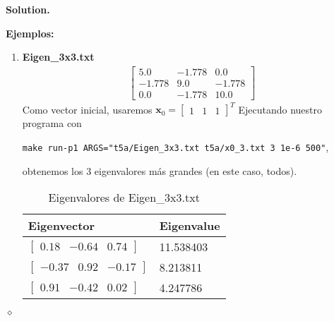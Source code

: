 \documentclass{article}
\theoremstyle{problemstyle}
\newenvironment{solution}{%
  \begin{mdframed}[linewidth=0.8pt,linecolor=Gray,backgroundcolor=Gray!5,roundcorner=5pt]%
  \noindent\textbf{Solution.}%
}{%
\hfill $ \diamond $ 
  \end{mdframed}%
}
\begin{document}
\begin{solution}
	\textbf{Ejemplos:}
	\begin{enumerate}
    \item \textbf{Eigen\_3x3.txt}
		      \begin{align*}
			      \begin{bmatrix}
				      5.0    & -1.778 & 0.0    \\
				      -1.778 & 9.0    & -1.778 \\
				      0.0    & -1.778 & 10.0
			      \end{bmatrix}
		      \end{align*}
		      Como vector inicial, usaremos $ \mathbf{x}_0 = \begin{bmatrix}
				      1 & 1 & 1
			      \end{bmatrix}^{T} $
		      Ejecutando nuestro programa con
		      \begin{center}
			      \texttt{make run-p1
				      ARGS="t5a/Eigen\_3x3.txt t5a/x0\_3.txt 3 1e-6 500"},
		      \end{center}
		      obtenemos los 3 eigenvalores m\'as grandes (en este caso, todos).
		      \begin{table}[H]
			      \begin{center}
				      \begin{tabular}{|l|l|}
					      \hline
					      Eigenvector           & Eigenvalue \\
					      \hline
					      \rule{0pt}{1.5em}
					      $ \begin{bmatrix}
							        0.18 & -0.64 & 0.74
						        \end{bmatrix} $  & 11.538403     \\
					      [0.5em]
					      \hline
					      \rule{0pt}{1.5em}
					      $ \begin{bmatrix}
							        -0.37 & 0.92 & -0.17
						        \end{bmatrix} $ & 8.213811       \\
					      [0.5em]
					      \hline
					      \rule{0pt}{1.5em}
					      $ \begin{bmatrix}
							        0.91 & -0.42 & 0.02
						        \end{bmatrix} $  & 4.247786      \\
					      [0.5em]
					      \hline
				      \end{tabular}
			      \end{center}
			      \caption{Eigenvalores de Eigen\_3x3.txt}\label{tab:3x3}
		      \end{table}

\end{enumerate}
\end{solution}
\end{document}
